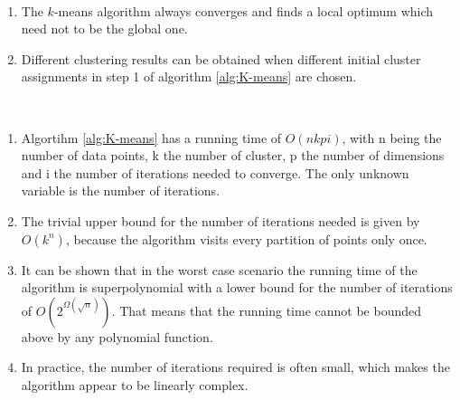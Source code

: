 \begin{remark}~
	\begin{enumerate}[label=(\roman*)]
		\item The $k$-means algorithm always converges and finds a local optimum which need not to be the global one.
		\item Different clustering results can be obtained when different initial cluster assignments in step 1 of algorithm \ref{alg:K-means} are chosen.
	\end{enumerate}
\end{remark}

\begin{remark}~
	\begin{enumerate}[label=(\roman*)]
		\item Algortihm \ref{alg:K-means} has a running time of $O(nkpi)$, with n being the number of data points, k the number of cluster, p the number of dimensions and i the number of iterations needed to converge. The only unknown variable is the number of iterations. 
		\item The trivial upper bound for the number of iterations needed is given by $O(k^n)$, because the algorithm visits every partition of points only once. 
		\item It can be shown \cite{arthur2006slow} that in the worst case scenario the running time of the algorithm is superpolynomial with a lower bound for the number of iterations of $O(2^{\Omega(\sqrt{n})})$. That means that the running time cannot be bounded above by any polynomial function.
		\item In practice, the number of iterations required is often small, which makes the algorithm appear to be linearly complex.  
	\end{enumerate}
\end{remark}

